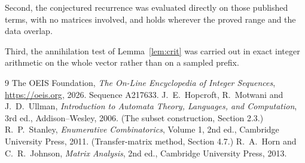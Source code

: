 \documentclass[11pt,a4paper]{article}
\theoremstyle{plain}
\theoremstyle{definition}
\begin{document}
Second, the conjectured recurrence was evaluated directly on those published terms, with no
matrices involved, and holds wherever the proved range and the data overlap.

Third, the annihilation test of Lemma~\ref{lem:crit} was carried out in exact integer
arithmetic on the whole vector rather than on a sampled prefix.

\begin{thebibliography}{9}
 The OEIS Foundation, \emph{The On-Line Encyclopedia of Integer
Sequences}, \url{https://oeis.org}, 2026. Sequence A217633.
 J.~E.~Hopcroft, R.~Motwani and J.~D.~Ullman, \emph{Introduction to Automata
Theory, Languages, and Computation}, 3rd ed., Addison--Wesley, 2006. (The subset
construction, Section 2.3.)
 R.~P.~Stanley, \emph{Enumerative Combinatorics}, Volume 1, 2nd ed.,
Cambridge University Press, 2011. (Transfer-matrix method, Section 4.7.)
 R.~A.~Horn and C.~R.~Johnson, \emph{Matrix Analysis}, 2nd ed., Cambridge
University Press, 2013.
\end{thebibliography}
\end{document}
